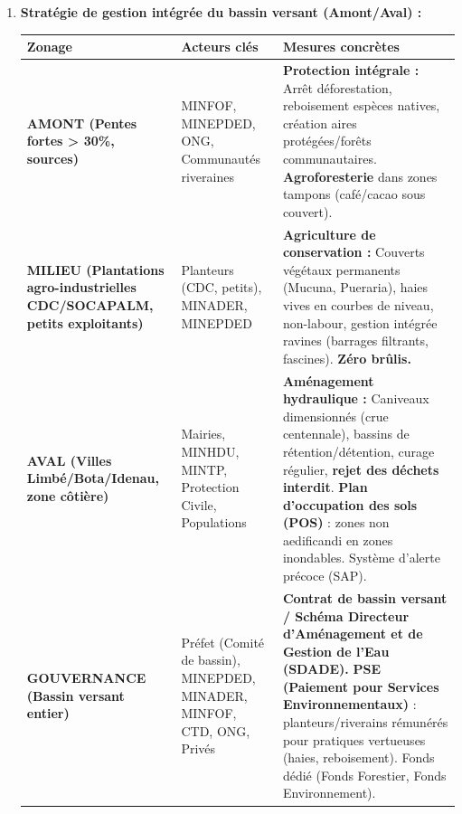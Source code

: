\documentclass[11pt]{article}
\begin{document}
\begin{corrige}
\begin{enumerate}
    \item \textbf{Stratégie de gestion intégrée du bassin versant (Amont/Aval) :}
    \begin{center}
    \begin{tabularx}{\linewidth}{|>{\bfseries}l|X|X|}\hline
    \textbf{Zonage} & \textbf{Acteurs clés} & \textbf{Mesures concrètes} \\ \hline
    \textbf{AMONT} (Pentes fortes > 30\%, sources) & MINFOF, MINEPDED, ONG, Communautés riveraines & \textbf{Protection intégrale :} Arrêt déforestation, reboisement espèces natives, création aires protégées/forêts communautaires. \textbf{Agroforesterie} dans zones tampons (café/cacao sous couvert). \\ \hline
    \textbf{MILIEU} (Plantations agro-industrielles CDC/SOCAPALM, petits exploitants) & Planteurs (CDC, petits), MINADER, MINEPDED & \textbf{Agriculture de conservation :} Couverts végétaux permanents (Mucuna, Pueraria), haies vives en courbes de niveau, non-labour, gestion intégrée ravines (barrages filtrants, fascines). \textbf{Zéro brûlis.} \\ \hline
    \textbf{AVAL} (Villes Limbé/Bota/Idenau, zone côtière) & Mairies, MINHDU, MINTP, Protection Civile, Populations & \textbf{Aménagement hydraulique :} Caniveaux dimensionnés (crue centennale), bassins de rétention/détention, curage régulier, \textbf{rejet des déchets interdit}. \textbf{Plan d'occupation des sols (POS)} : zones non aedificandi en zones inondables. Système d'alerte précoce (SAP). \\ \hline
    \textbf{GOUVERNANCE} (Bassin versant entier) & Préfet (Comité de bassin), MINEPDED, MINADER, MINFOF, CTD, ONG, Privés & \textbf{Contrat de bassin versant / Schéma Directeur d'Aménagement et de Gestion de l'Eau (SDADE).} \textbf{PSE (Paiement pour Services Environnementaux)} : planteurs/riverains rémunérés pour pratiques vertueuses (haies, reboisement). Fonds dédié (Fonds Forestier, Fonds Environnement). \\ \hline
    \end{tabularx}
    \end{center}
\end{enumerate}
\end{corrige}
\end{document}
